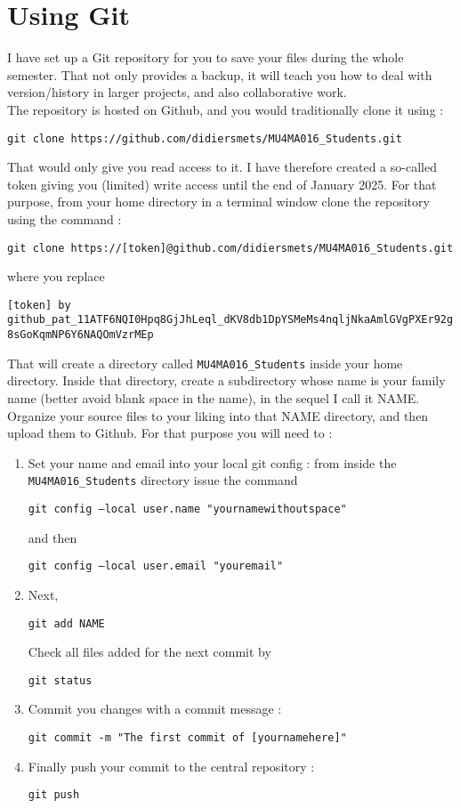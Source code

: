 \documentclass[a4paper,12pt]{article}
\begin{document}
\section{Using Git}
I have set up a Git repository for you to save your files during the whole
semester. That not only provides a backup, it will teach you how to deal with
version/history in larger projects, and also collaborative work.\\
The repository is hosted on Github, and you would traditionally clone it
using :
\begin{center}
{\tt git clone https://github.com/didiersmets/MU4MA016\_Students.git} 
\end{center}
That would only give you read access to it. I have therefore created a so-called token 
giving you (limited) write access until the end of January 2025. For that purpose, from 
your home directory in a terminal window clone the repository using 
the command :
\begin{center}
	{\tt git clone https://[token]@github.com/didiersmets/MU4MA016\_Students.git} 
\end{center}
where you replace 
\begin{center}
	{\tt [token] by }\\ 
	{\tt \footnotesize github\_pat\_11ATF6NQI0Hpq8GjJhLeql\_dKV8db1DpYSMeMs4nqljNkaAmlGVgPXEr92g8sGoKqmNP6Y6NAQOmVzrMEp}
\end{center}
That will create a directory called {\tt MU4MA016\_Students} inside your home
directory. Inside that directory, create a subdirectory whose name is your
family name (better avoid blank space in the name), in the sequel I call it
NAME. Organize your source files to your liking into that NAME directory, 
and then upload them to Github. For that purpose you will need to :
\begin{enumerate}
	\item
		Set your name and email into your local git config : from inside
		the {\tt MU4MA016\_Students} directory issue the command
		\begin{center}
		{\tt git config --local user.name "yournamewithoutspace"}
		\end{center}
		and then 
		\begin{center}
		{\tt git config --local user.email "youremail"}
		\end{center}
	\item Next, 
		\begin{center}
			{\tt git add NAME}
		\end{center}
		Check all files added for the next commit by
		\begin{center}
			{\tt git status}
		\end{center}
	\item Commit you changes with a commit message :
		\begin{center}
			{\tt git commit -m "The first commit of [yournamehere]"}
		\end{center}
	\item Finally push your commit to the central repository :
		\begin{center}
			{\tt git push}
		\end{center}
\end{enumerate}
\end{document}

